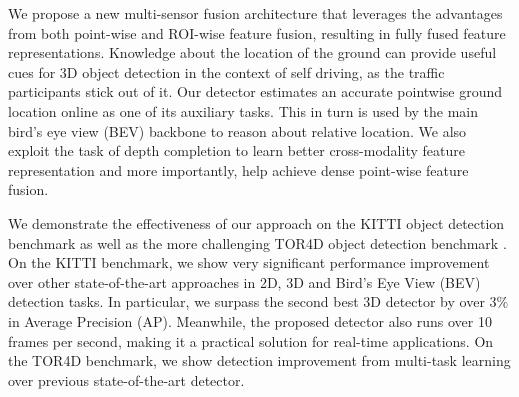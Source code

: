 \documentclass[10pt,twocolumn,letterpaper]{article}
\begin{document}
We propose a new multi-sensor fusion architecture that leverages the advantages from both point-wise and ROI-wise feature fusion, resulting in  fully fused feature representations. 
Knowledge about the location of the ground can provide useful cues for 3D object detection in the context of self driving, as the traffic participants stick out of it. Our detector estimates an accurate pointwise  ground location online as one of its auxiliary tasks. This in turn is used by the main bird's eye view (BEV) backbone to  reason about relative location. 
We also exploit the task of depth completion to learn better cross-modality feature representation and more importantly, help achieve dense point-wise feature fusion.

We demonstrate the effectiveness of our approach on the KITTI object detection benchmark \cite{kitti} as well as the more challenging TOR4D object detection benchmark \cite{pixor}. On the KITTI benchmark, we show very significant performance improvement over other state-of-the-art approaches in 2D, 3D and Bird's Eye View (BEV) detection tasks. 
In particular, we surpass the second best 3D detector by over $3\%$ in Average Precision (AP).
Meanwhile, the proposed detector also runs over 10 frames per second, making it a practical solution for real-time applications. On the TOR4D benchmark, we show detection improvement from multi-task learning over previous state-of-the-art detector.
\end{document}

